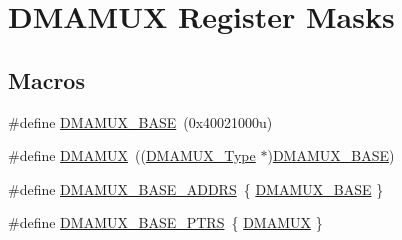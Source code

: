 \hypertarget{group___d_m_a_m_u_x___register___masks}{}\section{D\+M\+A\+M\+UX Register Masks}
\label{group___d_m_a_m_u_x___register___masks}
\subsection*{Macros}
\begin{DoxyCompactItemize}
\item 
\#define \mbox{\hyperlink{group___d_m_a_m_u_x___register___masks_gab59b16200deae0e15cd58d322b7cc75b}{D\+M\+A\+M\+U\+X\+\_\+\+B\+A\+SE}}~(0x40021000u)
\item 
\#define \mbox{\hyperlink{group___d_m_a_m_u_x___register___masks_ga0b7b7bd666a76aa791434bb59ea03693}{D\+M\+A\+M\+UX}}~((\mbox{\hyperlink{struct_d_m_a_m_u_x___type}{D\+M\+A\+M\+U\+X\+\_\+\+Type}} $\ast$)\mbox{\hyperlink{group___d_m_a_m_u_x___register___masks_gab59b16200deae0e15cd58d322b7cc75b}{D\+M\+A\+M\+U\+X\+\_\+\+B\+A\+SE}})
\item 
\#define \mbox{\hyperlink{group___d_m_a_m_u_x___register___masks_ga829aeb2ec17eff9c9fa684315a70bc2a}{D\+M\+A\+M\+U\+X\+\_\+\+B\+A\+S\+E\+\_\+\+A\+D\+D\+RS}}~\{ \mbox{\hyperlink{group___d_m_a_m_u_x___register___masks_gab59b16200deae0e15cd58d322b7cc75b}{D\+M\+A\+M\+U\+X\+\_\+\+B\+A\+SE}} \}
\item 
\#define \mbox{\hyperlink{group___d_m_a_m_u_x___register___masks_gaad218c12978071501dc2899f0624de4b}{D\+M\+A\+M\+U\+X\+\_\+\+B\+A\+S\+E\+\_\+\+P\+T\+RS}}~\{ \mbox{\hyperlink{group___d_m_a_m_u_x___register___masks_ga0b7b7bd666a76aa791434bb59ea03693}{D\+M\+A\+M\+UX}} \}
\end{DoxyCompactItemize}
